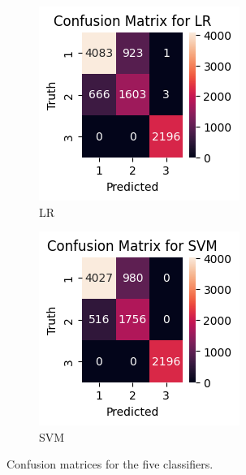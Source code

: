 \documentclass[conference]{IEEEtran}
\begin{document}
\begin{figure}[!t]
    \begin{subfigure}[b]{0.32\columnwidth}
        \includegraphics[width=\textwidth]{confusion_matrix_lr.png}
        \caption{LR}\label{fig:cm_lr}
    \end{subfigure}
    \hfill
    \begin{subfigure}[b]{0.32\columnwidth}
        \includegraphics[width=\textwidth]{confusion_matrix_svm.png}
        \caption{SVM}\label{fig:cm_svm}
    \end{subfigure}
    \caption{Confusion matrices for the five classifiers.}
    \label{fig:confusion_matrices}
    \vspace{-5mm}
\end{figure}
\end{document}
